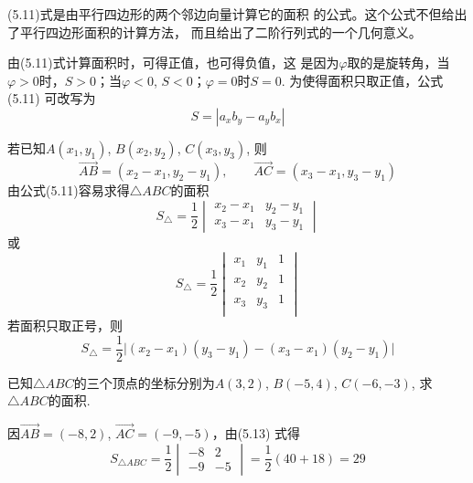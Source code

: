 (5.11)式是由平行四边形的两个邻边向量计算它的面积
的公式。这个公式不但给出了平行四边形面积的计算方法，
而且给出了二阶行列式的一个几何意义。

由(5.11)式计算面积时，可得正值，也可得负值，这
是因为$\varphi$取的是旋转角，当$\varphi>0$时，$S>0$；当$\varphi<0$, 
$S<0$；$\varphi=0$时$S=0$. 为使得面积只取正值，公式(5.11)
可改写为
\begin{equation}
    S=|a_xb_y-a_yb_x|
\end{equation}

若已知$A(x_1,y_1)$, $B(x_2,y_2)$, $C(x_3,y_3)$, 则
\[\Vec{AB}=(x_2-x_1,y_2-y_1),\qquad \Vec{AC}=(x_3-x_1,y_3-y_1)\]
由公式(5.11)容易求得$\triangle ABC$的面积
\begin{equation}
    S_{\triangle}=\frac{1}{2}\begin{vmatrix}
     x_2-x_1&y_2-y_1\\
     x_3-x_1&y_3-y_1   
    \end{vmatrix}
\end{equation}
或
\[ S_{\triangle}=\frac{1}{2}\begin{vmatrix}
    x_1&y_1&1\\
    x_2&y_2  &1\\ 
    x_3&y_3  &1\\ 
   \end{vmatrix}\]
   若面积只取正号，则
\[S_{\triangle}=\frac{1}{2}\Big|(x_2-x_1)(y_3-y_1)-(x_3-x_1)(y_2-y_1)\Big|\]

\begin{example}
      已知$\triangle ABC$的三个顶点的坐标分别为$A(3,2)$, 
$B(-5,4)$, $C(-6,-3)$, 求$\triangle ABC$的面积.
\end{example}

\begin{solution}
因$\Vec{AB}=(-8,2)$, $\Vec{AC}=(-9,-5)$，由(5.13)
式得
\[S_{\triangle ABC}=\frac{1}{2}\begin{vmatrix}
    -8&2\\-9&-5
\end{vmatrix}=\frac{1}{2}(40+18)=29\]
\end{solution}



